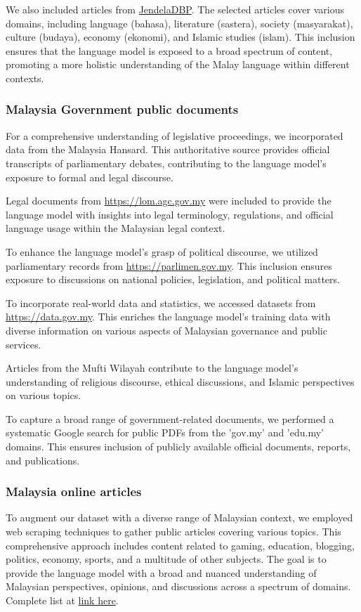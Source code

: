 \documentclass[preprint]{article}
\begin{document}
We also included articles from \href{https://jendeladbp.my/}{JendelaDBP}. The selected articles cover various domains, including language (bahasa), literature (sastera), society (masyarakat), culture (budaya), economy (ekonomi), and Islamic studies (islam). This inclusion ensures that the language model is exposed to a broad spectrum of content, promoting a more holistic understanding of the Malay language within different contexts.

\subsubsection{Malaysia Government public documents}

For a comprehensive understanding of legislative proceedings, we incorporated data from the Malaysia Hansard. This authoritative source provides official transcripts of parliamentary debates, contributing to the language model's exposure to formal and legal discourse.

Legal documents from \url{https://lom.agc.gov.my} were included to provide the language model with insights into legal terminology, regulations, and official language usage within the Malaysian legal context.

To enhance the language model's grasp of political discourse, we utilized parliamentary records from \url{https://parlimen.gov.my}. This inclusion ensures exposure to discussions on national policies, legislation, and political matters.

To incorporate real-world data and statistics, we accessed datasets from \url{https://data.gov.my}. This enriches the language model's training data with diverse information on various aspects of Malaysian governance and public services.

Articles from the Mufti Wilayah contribute to the language model's understanding of religious discourse, ethical discussions, and Islamic perspectives on various topics.

To capture a broad range of government-related documents, we performed a systematic Google search for public PDFs from the 'gov.my' and 'edu.my' domains. This ensures inclusion of publicly available official documents, reports, and publications.

\subsubsection{Malaysia online articles}

To augment our dataset with a diverse range of Malaysian context, we employed web scraping techniques to gather public articles covering various topics. This comprehensive approach includes content related to gaming, education, blogging, politics, economy, sports, and a multitude of other subjects. The goal is to provide the language model with a broad and nuanced understanding of Malaysian perspectives, opinions, and discussions across a spectrum of domains. Complete list at \href{https://github.com/malaysia-ai/dedup-text-dataset/blob/main/mistral/combine-mistral.ipynb}{link here}.
\end{document}
